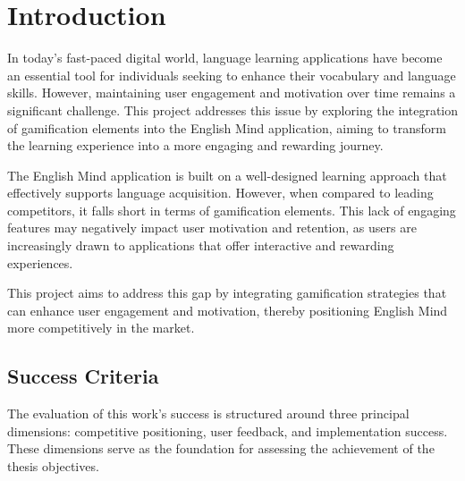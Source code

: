 \chapter{Introduction}

In today's fast-paced digital world, language learning applications have become an essential tool for individuals seeking to enhance their vocabulary and language skills. However, maintaining user engagement and motivation over time remains a significant challenge. This project addresses this issue by exploring the integration of gamification elements into the English Mind application, aiming to transform the learning experience into a more engaging and rewarding journey.

The English Mind application is built on a well-designed learning approach that effectively supports language acquisition. However, when compared to leading competitors, it falls short in terms of gamification elements. This lack of engaging features may negatively impact user motivation and retention, as users are increasingly drawn to applications that offer interactive and rewarding experiences. 

This project aims to address this gap by integrating gamification strategies that can enhance user engagement and motivation, thereby positioning English Mind more competitively in the market.

\newpage

\section{Success Criteria}
\label{sec:success-criteria}

The evaluation of this work's success is structured around three principal dimensions: competitive positioning, user feedback, and implementation success. These dimensions serve as the foundation for assessing the achievement of the thesis objectives.

